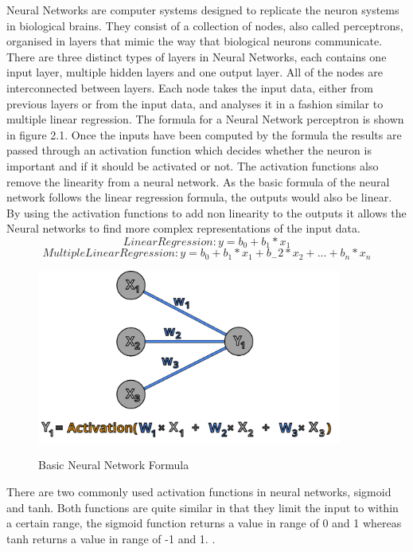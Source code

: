 \documentclass{imc-inf}
\begin{document}
 	Neural Networks are computer systems designed to replicate the neuron systems in biological brains. They consist of a collection of nodes, also called perceptrons, organised in layers that mimic the way that biological neurons communicate. 
 	There are three distinct types of layers in Neural Networks, each contains one input layer, multiple hidden layers and one output layer. All of the nodes are interconnected between layers. Each node takes the input data, either from previous layers or from the input data, and analyses it in a fashion similar to multiple linear regression. The formula for a Neural Network perceptron is shown in figure 2.1. Once the inputs have been computed by the formula the results are passed through an activation function which decides whether the neuron is important and if it should be activated or not. The activation functions also remove the linearity from a neural network. As the basic formula of the neural network follows the linear regression formula, the outputs would also be linear. By using the activation functions to add non linearity to the outputs it allows the Neural networks to find more complex representations of the input data. 
 	\begin{equation}
 		Linear Regression: y = b_{0} + b_{1}*x_{1}
 	\end{equation}
		\begin{equation}
		Multiple Linear Regression: y = b_{0} + b_{1}*x_{1} + b_-{2}*x_{2} + ... + b_{n}*x_{n}
	\end{equation}
	\begin{figure}
		\caption{Basic Neural Network Formula}
		\includegraphics[width=10cm]{media/nn_formula.png}
		\cite{website:BH_AI}
	\end{figure}
	\newline
	There are two commonly used activation functions in neural networks, sigmoid and tanh. Both functions are quite similar in that they limit the input to within a certain range, the sigmoid function returns a value in range of 0 and 1 whereas tanh returns a value in range of -1 and 1. \cite{website:Activation}.
	
\end{document}
